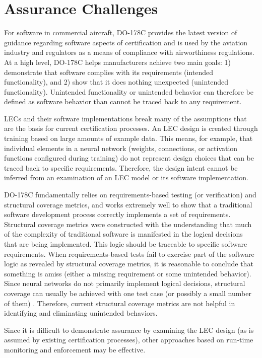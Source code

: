 \section{Assurance Challenges}

For software in commercial aircraft, DO-178C \cite{DO-178} provides
the latest version of guidance regarding software aspects of
certification and is used by the aviation industry and regulators
as a means of compliance with airworthiness regulations.
At a high level, DO-178C helps manufacturers achieve two
main goals: 1) demonstrate that software complies with
its requirements (intended functionality), and 2) show that it does
nothing unexpected (unintended functionality). Unintended
functionality or unintended behavior can therefore be defined
as software behavior than cannot be traced back to any requirement.

LECs and their software implementations
break many of the assumptions that are the basis for current
certification processes. An LEC design
is created through training based on large amounts of example
data.  This means, for example, that individual elements
in a neural network (weights, connections, or activation 
functions configured during training) do not represent design 
choices that can be traced back to specific requirements.
Therefore, the design intent cannot
be inferred from an examination of an LEC model or its
software implementation.  

DO-178C fundamentally relies on requirements-based testing
(or verification) and structural coverage metrics, and works 
extremely well to show that a traditional software development process 
correctly implements a set of requirements.  
Structural coverage metrics were constructed with the understanding
that much of the complexity of traditional software
is manifested in the logical decisions that are being implemented.
This logic should be traceable to specific software
requirements. When requirements-based tests fail to exercise
part of the software logic as revealed by structural coverage
metrics, it is reasonable to conclude that something is amiss
(either a missing requirement or some unintended behavior).
Since neural networks do not primarily implement logical
decisions, structural coverage can usually be achieved with one
test case (or possibly a small number of them) \cite{whitebox}. 
Therefore, current structural coverage metrics are not
helpful in identifying and eliminating unintended behaviors.

Since it is difficult to demonstrate assurance by examining
the LEC design (as is assumed by existing certification processes),
other approaches based on run-time monitoring and
enforcement may be effective. 